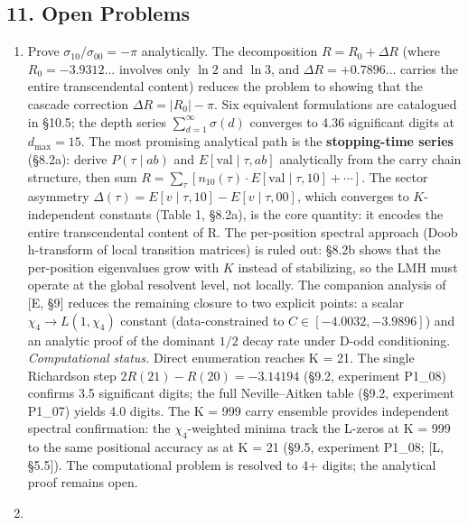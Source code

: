 \documentclass[
  11pt,
]{article}
\begin{document}
\newpage

\subsection{11. Open Problems}\label{open-problems}

\begin{enumerate}
\def\labelenumi{\arabic{enumi}.}
\item
  Prove \(\sigma_{10}/\sigma_{00} = -\pi\) analytically. The decomposition
  \(R = R_0 + \Delta R\) (where \(R_0 = -3.9312\ldots\) involves only \(\ln 2\)
  and \(\ln 3\), and \(\Delta R = +0.7896\ldots\) carries the entire
  transcendental content) reduces the problem to showing that the cascade
  correction \(\Delta R = |R_0| - \pi\). Six equivalent formulations are
  catalogued in §10.5; the depth series \(\sum_{d=1}^\infty \sigma(d)\)
  converges to 4.36 significant digits at \(d_{\max} = 15\). The most promising
  analytical path is the \textbf{stopping-time series} (§8.2a): derive
  \(P(\tau \mid ab)\) and \(E[\text{val} \mid \tau, ab]\) analytically from the
  carry chain structure, then sum
  \(R = \sum_\tau [n_{10}(\tau) \cdot E[\text{val} \mid \tau, 10] + \cdots]\).
  The sector asymmetry
  \(\Delta(\tau) = E[v \mid \tau, 10] - E[v \mid \tau, 00]\), which converges to
  \(K\)-independent constants (Table 1, §8.2a), is the core quantity: it encodes
  the entire transcendental content of R. The per-position spectral approach
  (Doob h-transform of local transition matrices) is ruled out: §8.2b shows that
  the per-position eigenvalues grow with \(K\) instead of stabilizing, so the
  LMH must operate at the global resolvent level, not locally. The companion
  analysis of {[}E, §9{]} reduces the remaining closure to two explicit points:
  a scalar \(\chi_4 \to L(1,\chi_4)\) constant (data-constrained to
  \(C \in [-4.0032, -3.9896]\)) and an analytic proof of the dominant \(1/2\)
  decay rate under D-odd conditioning. \emph{Computational status.} Direct
  enumeration reaches K = 21. The single Richardson step
  \(2R(21) - R(20) = -3.14194\) (§9.2, experiment P1\_08) confirms 3.5
  significant digits; the full Neville--Aitken table (§9.2, experiment P1\_07)
  yields 4.0 digits. The K = 999 carry ensemble provides independent spectral
  confirmation: the \(\chi_4\)-weighted minima track the L-zeros at K = 999 to
  the same positional accuracy as at K = 21 (§9.5, experiment P1\_08; {[}L,
  §5.5{]}). The computational problem is resolved to 4+ digits; the analytical
  proof remains open.
\item

\end{enumerate}
\end{document}
